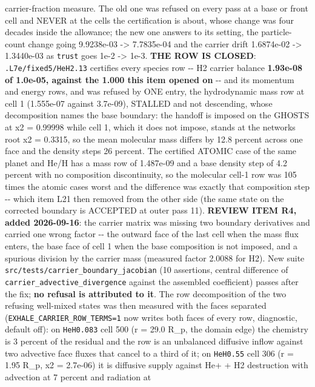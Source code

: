 \documentclass[english,a4paper]{my_memo}
\begin{document}
\begin{itemize}
  carrier-fraction measure. The old one was refused on every pass at a base or
  front cell and NEVER at the cells the certification is about, whose change
  was four decades inside the allowance; the new one answers to its setting,
  the particle-count change going 9.9238e-03 -\textgreater{} 7.7835e-04 and the carrier
  drift 1.6874e-02 -\textgreater{} 1.3440e-03 as \texttt{trust} goes 1e-2 -\textgreater{} 1e-3. \textbf{THE ROW IS
  CLOSED}: \texttt{.L7e/fixed5/HeH2.13} certifies every species row -\/- H2 carrier
  balance \textbf{1.93e-08 of 1.0e-05, against the 1.000 this item opened on} -\/- and
  its momentum and energy rows, and was refused by ONE entry, the hydrodynamic
  mass row at cell 1 (1.555e-07 against 3.7e-09), STALLED and not descending,
  whose decomposition names the base boundary: the handoff is imposed on the
  GHOSTS at x2 = 0.99998 while cell 1, which it does not impose, stands at the
  network\textquotesingle s root x2 = 0.3315, so the mean molecular mass differs by 12.8
  percent across one face and the density steps 26 percent. The certified
  ATOMIC case of the same planet and He/H has a mass row of 1.487e-09 and a
  base density step of 4.2 percent with no composition discontinuity, so the
  molecular cell-1 row was 105 times the atomic case\textquotesingle s worst and the difference
  was exactly that composition step -\/- which item L21 then removed from the
  other side (the same state on the corrected boundary is ACCEPTED at outer
  pass 11). \textbf{REVIEW ITEM R4, added 2026-09-16}: the carrier matrix was
  missing two boundary derivatives and carried one wrong factor -\/- the outward
  face of the last cell when the mass flux enters, the base face of cell 1 when
  the base composition is not imposed, and a spurious division by the carrier
  mass (measured factor 2.0088 for H2). New suite
  \texttt{src/tests/carrier\_boundary\_jacobian} (10 assertions, central difference of
  \texttt{carrier\_advective\_divergence} against the assembled coefficient) passes
  after the fix; \textbf{no refusal is attributed to it}. The row decomposition of
  the two refusing well-mixed states was then measured with the faces separated
  (\texttt{EXHALE\_CARRIER\_ROW\_TERMS=1} now writes both faces of every row,
  diagnostic, default off): on \texttt{HeH0.083} cell 500 (r = 29.0 R\_p, the domain
  edge) the chemistry is 3 percent of the residual and the row is an unbalanced
  diffusive inflow against two advective face fluxes that cancel to a third of
  it; on \texttt{HeH0.55} cell 306 (r = 1.95 R\_p, x2 = 2.7e-06) it is diffusive supply
  against He+ + H2 destruction with advection at 7 percent and radiation at

\end{itemize}
\end{document}
